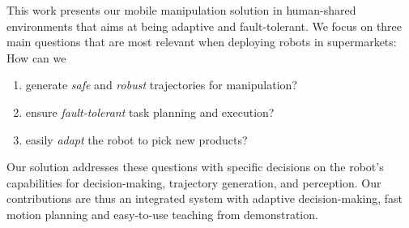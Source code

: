 This work presents our mobile manipulation solution
in human-shared environments that aims at being adaptive and fault-tolerant. %
We focus on three main questions that are most 
relevant when deploying robots in supermarkets: How can we

\begin{enumerate}
  \item generate \emph{safe} and \emph{robust} trajectories for manipulation? %
  \item ensure \emph{fault-tolerant} task planning and execution? %
  \item easily \emph{adapt} the robot to pick new products? %
\end{enumerate}
Our solution addresses these questions with specific decisions on the robot's capabilities for decision-making, trajectory generation, and perception. Our contributions are thus an integrated system with adaptive decision-making, fast motion planning and easy-to-use teaching from demonstration. 
